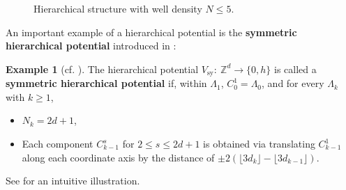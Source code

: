 \documentclass[11pt,reqno,UTF8,twoside]{amsart}
\newcommand{\Z}{\mathbb{Z}}
\theoremstyle{definition}
\newtheorem{ex}[thm]{Example}
\numberwithin{equation}{section}
\begin{document}
\begin{figure}[htbp]

\caption{Hierarchical structure with well density $N\leq 5$.}
\label{hierarchical structure figure}
	
\end{figure}


An important example of a hierarchical potential is the \textbf{symmetric hierarchical potential} introduced in \cite{JLMS84, JLMS85}: %
\begin{ex}[cf. \cite{JLMS84, JLMS85}]\label{symmetric hierarchical potential}
The  hierarchical potential $V_{\text{sy}}:\ \Z^d\to\{0,h\}$ is called a \textbf{symmetric hierarchical potential} if, within $\Lambda_1$,   $C_0^1 = \Lambda_0$, and for every $\Lambda_k$ with $k \geq 1$, 
\begin{itemize}
\item $N_k = 2d + 1$,
\item Each component $C_{k-1}^s$ for $2 \leq s \leq 2d + 1$ is obtained via  translating $C_{k-1}^1$ along each  coordinate axis  by the  distance of $\pm 2(\lfloor 3d_k \rfloor - \lfloor 3d_{k-1} \rfloor)$.
\end{itemize}
See \cite[Fig. 2]{JLMS85} for an intuitive illustration.
\end{ex}
\end{document}
